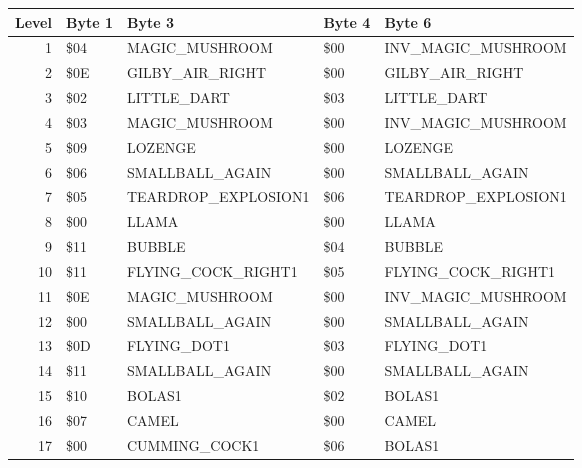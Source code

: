 \begin{figure}[H]
  {
  \setlength{\tabcolsep}{3.0pt}
  \setlength\cmidrulewidth{\heavyrulewidth} %
  \begin{adjustbox}{width=\textwidth}

\begin{tabular}{rllll}
\toprule
   Level & Byte 1    & Byte 3               & Byte 4    & Byte 6               \\
\midrule
       1 & \$04       & MAGIC\_MUSHROOM       & \$00       & INV\_MAGIC\_MUSHROOM   \\
       2 & \$0E       & GILBY\_AIR\_RIGHT & \$00       & GILBY\_AIR\_RIGHT \\
       3 & \$02       & LITTLE\_DART          & \$03       & LITTLE\_DART          \\
       4 & \$03       & MAGIC\_MUSHROOM       & \$00       & INV\_MAGIC\_MUSHROOM   \\
       5 & \$09       & LOZENGE              & \$00       & LOZENGE              \\
       6 & \$06       & SMALLBALL\_AGAIN      & \$00       & SMALLBALL\_AGAIN      \\
       7 & \$05       & TEARDROP\_EXPLOSION1  & \$06       & TEARDROP\_EXPLOSION1  \\
       8 & \$00       & LLAMA                & \$00       & LLAMA                \\
       9 & \$11       & BUBBLE               & \$04       & BUBBLE               \\
      10 & \$11       & FLYING\_COCK\_RIGHT1   & \$05       & FLYING\_COCK\_RIGHT1   \\
      11 & \$0E       & MAGIC\_MUSHROOM       & \$00       & INV\_MAGIC\_MUSHROOM   \\
      12 & \$00       & SMALLBALL\_AGAIN      & \$00       & SMALLBALL\_AGAIN      \\
      13 & \$0D       & FLYING\_DOT1          & \$03       & FLYING\_DOT1          \\
      14 & \$11       & SMALLBALL\_AGAIN      & \$00       & SMALLBALL\_AGAIN      \\
      15 & \$10       & BOLAS1               & \$02       & BOLAS1               \\
      16 & \$07       & CAMEL                & \$00       & CAMEL                \\
      17 & \$00       & CUMMING\_COCK1        & \$06       & BOLAS1               \\

\end{tabular}
\end{adjustbox}}
\end{figure}
